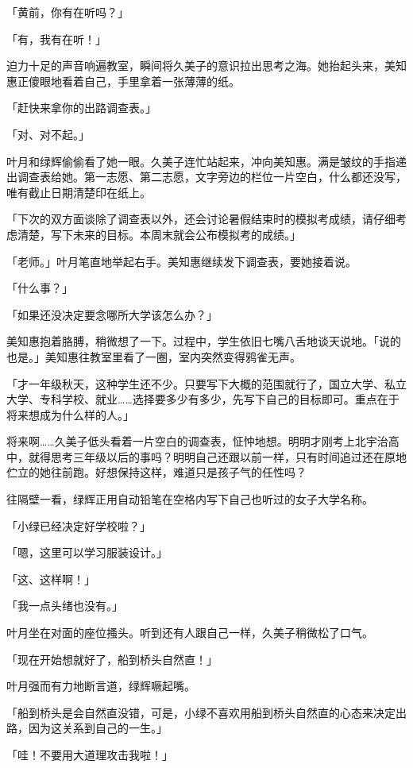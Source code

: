\documentclass[UTF8]{ctexart}
\begin{document}
    「黄前，你有在听吗？」 

    「有，我有在听！」 

    迫力十足的声音响遍教室，瞬间将久美子的意识拉出思考之海。她抬起头来，美知惠正傻眼地看着自己，手里拿着一张薄薄的纸。 

    「赶快来拿你的出路调查表。」 

    「对、对不起。」 

    叶月和绿辉偷偷看了她一眼。久美子连忙站起来，冲向美知惠。满是皱纹的手指递出调查表给她。第一志愿、第二志愿，文字旁边的栏位一片空白，什么都还没写，唯有截止日期清楚印在纸上。 

    「下次的双方面谈除了调查表以外，还会讨论暑假结束时的模拟考成绩，请仔细考虑清楚，写下未来的目标。本周末就会公布模拟考的成绩。」 

    「老师。」叶月笔直地举起右手。美知惠继续发下调查表，要她接着说。 

    「什么事？」 

    「如果还没决定要念哪所大学该怎么办？」 

    美知惠抱着胳膊，稍微想了一下。过程中，学生依旧七嘴八舌地谈天说地。「说的也是。」美知惠往教室里看了一圈，室内突然变得鸦雀无声。 

    「才一年级秋天，这种学生还不少。只要写下大概的范围就行了，国立大学、私立大学、专科学校、就业……选择要多少有多少，先写下自己的目标即可。重点在于将来想成为什么样的人。」 

    将来啊……久美子低头看着一片空白的调查表，怔忡地想。明明才刚考上北宇治高中，就得思考三年级以后的事吗？明明自己还跟以前一样，只有时间追过还在原地伫立的她往前跑。好想保持这样，难道只是孩子气的任性吗？ 

    往隔壁一看，绿辉正用自动铅笔在空格内写下自己也听过的女子大学名称。 

    「小绿已经决定好学校啦？」 

    「嗯，这里可以学习服装设计。」 

    「这、这样啊！」 

    「我一点头绪也没有。」 

    叶月坐在对面的座位搔头。听到还有人跟自己一样，久美子稍微松了口气。 

    「现在开始想就好了，船到桥头自然直！」 

    叶月强而有力地断言道，绿辉噘起嘴。 

    「船到桥头是会自然直没错，可是，小绿不喜欢用船到桥头自然直的心态来决定出路，因为这关系到自己的一生。」 

    「哇！不要用大道理攻击我啦！」 
\end{document}

